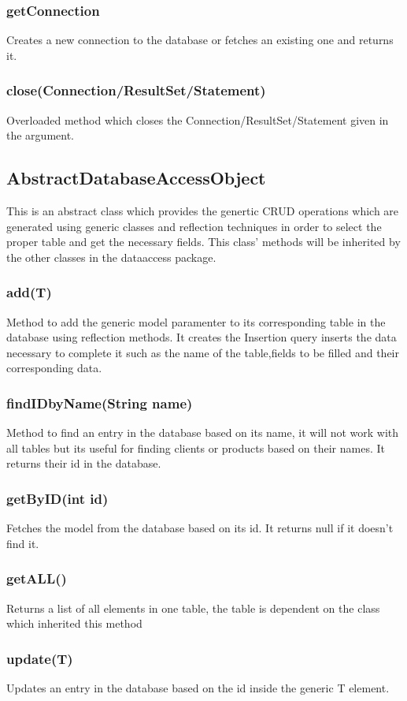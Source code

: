 \documentclass[10pt,a4paper]{article}
\begin{document}
\subsubsection{getConnection}
Creates a new connection to the database or fetches an existing one and returns it.
\subsubsection{close(Connection/ResultSet/Statement)}
Overloaded method which closes the Connection/ResultSet/Statement given in the argument.

\subsection{AbstractDatabaseAccessObject}
This is an abstract class which provides the genertic CRUD operations which are generated using generic classes and reflection techniques in order to select the proper table and get the necessary fields. This class' methods will be inherited by the other classes in the dataaccess package.
\subsubsection{add(T)}
Method to add the generic model paramenter to its corresponding table in the database using reflection methods. It creates the Insertion query inserts the data necessary to complete it such as the name of the table,fields to be filled and their corresponding data.
\subsubsection{findIDbyName(String name)}
Method to find an entry in the database based on its name, it will not work with all tables but its useful for finding clients or products based on their names. It returns their id in the database.
\subsubsection{getByID(int id)}
Fetches the model from the database based on its id. It returns null if it doesn't find it.
\subsubsection{getALL()}
Returns a list of all elements in one table, the table is dependent on the class which inherited this method
\subsubsection{update(T)}
Updates an entry in the database based on the id inside the generic T element.
\end{document}
